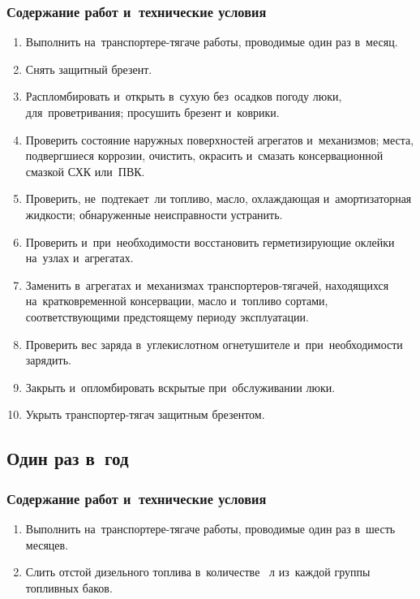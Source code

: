 \subsubsection{Содержание работ и~технические условия}
\begin{enumerate}
    \item Выполнить на~транспортере-тягаче работы, проводимые один раз в~месяц. 
    \item Снять защитный брезент. 
    \item Распломбировать и~открыть в~сухую без~осадков погоду люки, для~проветривания; просушить брезент и~коврики. 
    \item Проверить состояние наружных поверхностей агрегатов и~механизмов; места, подвергшиеся коррозии, очистить, окрасить и~смазать консервационной смазкой СХК или~ПВК. 
    \item Проверить, не~подтекает~ли топливо, масло, охлаждающая и~амортизаторная жидкости; обнаруженные неисправности устранить. 
    \item Проверить и~при~необходимости восстановить герметизирующие оклейки на~узлах и~агрегатах. 
    \item Заменить в~агрегатах и~механизмах транспортеров-тягачей, находящихся на~кратковременной консервации, масло и~топливо сортами, соответствующими предстоящему периоду эксплуатации. 
    \item Проверить вес заряда в~углекислотном огнетушителе и~при~необходимости зарядить. 
    \item Закрыть и~опломбировать вскрытые при~обслуживании люки. 
    \item Укрыть транспортер-тягач защитным брезентом. 
\end{enumerate}


\subsection{Один раз в~год}
\subsubsection{Содержание работ и~технические условия}
\begin{enumerate}
    \item Выполнить на~транспортере-тягаче работы, проводимые один раз в~шесть месяцев. 
    \item Слить отстой дизельного топлива в~количестве ~л из~каждой группы топливных баков. 
\end{enumerate}

